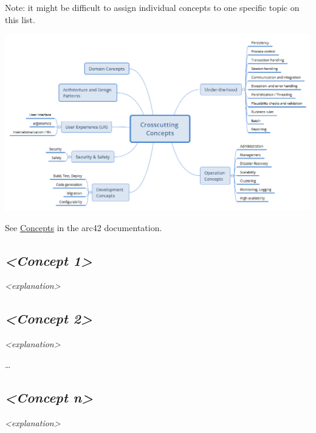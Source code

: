 Note: it might be difficult to assign individual concepts to one
specific topic on this list.

\includegraphics{../images/08-Crosscutting-Concepts-Structure-EN.png}

See \href{https://docs.arc42.org/section-8/}{Concepts} in the arc42
documentation.

\hypertarget{__emphasis_concept_1_emphasis}{%
\subsection{\texorpdfstring{\emph{\textless Concept
1\textgreater{}}}{\textless Concept 1\textgreater{}}}\label{__emphasis_concept_1_emphasis}}

\emph{\textless explanation\textgreater{}}

\hypertarget{__emphasis_concept_2_emphasis}{%
\subsection{\texorpdfstring{\emph{\textless Concept
2\textgreater{}}}{\textless Concept 2\textgreater{}}}\label{__emphasis_concept_2_emphasis}}

\emph{\textless explanation\textgreater{}}

\ldots{}

\hypertarget{__emphasis_concept_n_emphasis}{%
\subsection{\texorpdfstring{\emph{\textless Concept
n\textgreater{}}}{\textless Concept n\textgreater{}}}\label{__emphasis_concept_n_emphasis}}

\emph{\textless explanation\textgreater{}}
